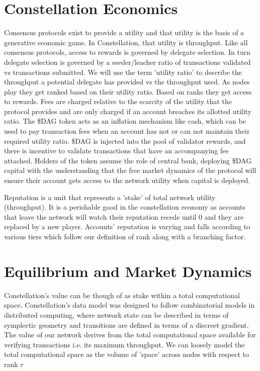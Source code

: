 \documentclass{article}
\begin{document}
\section{Constellation Economics}
Consensus protocols exist to provide a utility and that utility is the basis of a generative economic game. In Constellation, that utility is throughput. Like all consensus protocols, access to rewards is governed by delegate selection. In turn delegate selection is governed by a seeder/leacher ratio of transactions validated vs transactions submitted. We will use the term 'utility ratio' to describe the throughput a potential delegate has provided vs the throughput used. As nodes play they get ranked based on their utility ratio. Based on ranks they get access to rewards. Fees are charged relative to the scarcity of the utility that the protocol provides and are only charged if an account breaches its allotted utility ratio. The \$DAG token acts as an inflation mechanism like cash, which can be used to pay transaction fees when an account has not or can not maintain their required utility ratio. \$DAG is injected into the pool of validator rewards, and there is incentive to validate transactions that have an accompanying fee attached. Holders of the token assume the role of central bank, deploying \$DAG capital with the understanding that the free market dynamics of the protocol will ensure their account gets access to the network utility when capital is deployed. 

Reputation is a unit that represents a 'stake' of total network utility (throughput). It is a perishable good in the constellation economy as accounts that leave the network will watch their reputation recede until 0 and they are replaced by a new player. Accounts' reputation is varying and falls according to various tiers which follow our definition of rank along with a branching factor.

\section{Equilibrium and Market Dynamics}
Constellation's value can be though of as stake within a total computational space. Constellation's data model was designed to follow combinatorial models in distributed computing, where network state can be described in terms of symplectic geometry and transitions are defined in terms of a discreet gradient. The value of our network derives from the total computational space available for verifying transactions i.e. its maximum throughput. We can loosely model the total computational space as the volume of 'space' across nodes with respect to rank $r$
\end{document}
